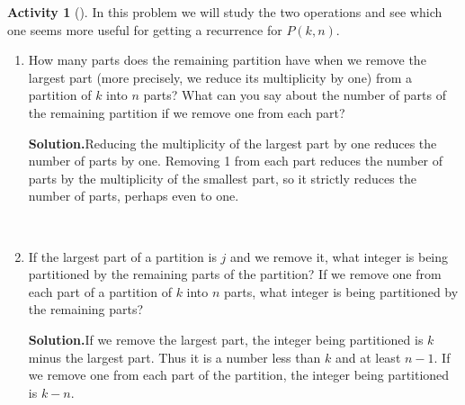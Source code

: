 \documentclass[10pt,]{book}
\theoremstyle{plain}
\theoremstyle{definition}
\newtheorem{activity}[project]{Activity}
\numberwithin{equation}{chapter}
\begin{document}
\begin{activity}[]\label{numberpartitionrecurrence}
In this problem we will study the two operations and see which one seems more useful for getting a recurrence for \(P(k,n)\).%
~\par
\begin{enumerate}[label=(\alph*)]
 \item How many parts does the remaining partition have when we remove the largest part (more precisely, we reduce its multiplicity by one) from a partition of \(k\) into \(n\) parts?  What can you say about the number of parts of the remaining partition if we remove one from each part?%
\par\medskip\noindent%
\textbf{Solution.}\quad Reducing the multiplicity of the largest part by one reduces the number of parts by one. Removing 1 from each part reduces the number of parts by the multiplicity of the smallest part, so it strictly reduces the number of parts, perhaps even to one.%

~\par
\item If the largest part of a partition is \(j\) and we remove it, what integer is being partitioned by the remaining parts of the partition? If we remove one from each part of a partition of \(k\) into \(n\) parts, what integer is being partitioned by the remaining parts?%
\par\medskip\noindent%
\textbf{Solution.}\quad If we remove the largest part, the integer being partitioned is \(k\) minus the largest part. Thus it is a number less than \(k\) and at least \(n-1\). If we remove one from each part of the partition, the integer being partitioned is \(k-n\).%


\end{enumerate}
\end{activity}
\end{document}
